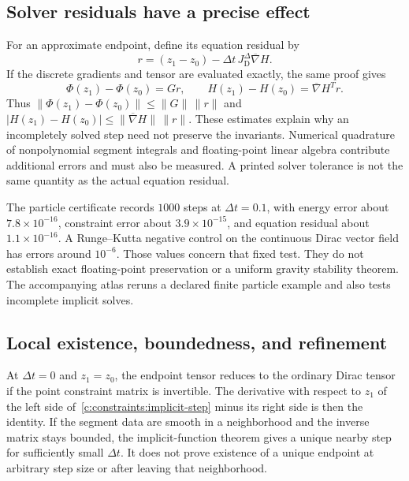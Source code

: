 \subsection{Solver residuals have a precise effect}
For an approximate endpoint, define its equation residual by
\begin{equation}
 r=(z_1-z_0)-\Delta t\,J_{\mathrm D}^{\Delta}\overline\nabla H.
\end{equation}
If the discrete gradients and tensor are evaluated exactly, the same proof gives
\begin{equation}
 \Phi(z_1)-\Phi(z_0)=Gr,\qquad
 H(z_1)-H(z_0)=\overline\nabla H^Tr.
 \label{c:constraints:residual-bound}
\end{equation}
Thus $\|\Phi(z_1)-\Phi(z_0)\|\le\|G\|\,\|r\|$ and
$|H(z_1)-H(z_0)|\le\|\overline\nabla H\|\,\|r\|$.
These estimates explain why an incompletely solved step need not preserve the invariants. Numerical quadrature of nonpolynomial segment integrals and floating-point linear algebra contribute additional errors and must also be measured. A printed solver tolerance is not the same quantity as the actual equation residual.

The particle certificate records $1000$ steps at $\Delta t=0.1$, with energy error about $7.8\times10^{-16}$, constraint error about $3.9\times10^{-15}$, and equation residual about $1.1\times10^{-16}$. A Runge--Kutta negative control on the continuous Dirac vector field has errors around $10^{-6}$. Those values concern that fixed test. They do not establish exact floating-point preservation or a uniform gravity stability theorem. The accompanying atlas reruns a declared finite particle example and also tests incomplete implicit solves.


\subsection{Local existence, boundedness, and refinement}
At $\Delta t=0$ and $z_1=z_0$, the endpoint tensor reduces to the ordinary Dirac tensor if the point constraint matrix is invertible. The derivative with respect to $z_1$ of the left side of~\eqref{c:constraints:implicit-step} minus its right side is then the identity. If the segment data are smooth in a neighborhood and the inverse matrix stays bounded, the implicit-function theorem gives a unique nearby step for sufficiently small $\Delta t$. It does not prove existence of a unique endpoint at arbitrary step size or after leaving that neighborhood.

